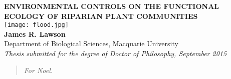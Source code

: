 \documentclass[openright,12pt,a4paper]{memoir}
\begin{document}
\doublespacing
{}

\begin{titlingpage}
\centering
\begin{onehalfspacing}
\vspace{40mm} %
\LARGE{\textbf{ENVIRONMENTAL CONTROLS ON THE FUNCTIONAL ECOLOGY OF RIPARIAN PLANT COMMUNITIES}} \\
\vspace{25mm}
\texttt{[image: flood.jpg]} \\
\vspace{15mm}
\large{\textbf{James R. Lawson}}\\
\small{Department of Biological Sciences, Macquarie University}\\
\vspace{20mm}
\small{\textit{Thesis submitted for the degree of Doctor of Philosophy, September 2015}}\\
\end{onehalfspacing}
\end{titlingpage}

\frontmatter
\clearpage %
\renewcommand{\abstractname}{}
\setlength{\absparindent}{0mm}

\begin{abstract} %
\vspace{50mm}
\begin{center}
\textit{For Noel.}
\end{center}
\end{abstract}
\end{document}
